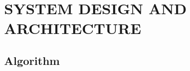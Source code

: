 \documentclass[main]{subfiles}
\begin{document}
\chapter{\MakeUppercase{System Design and Architecture}}

\section{Algorithm}
	
\end{document}
